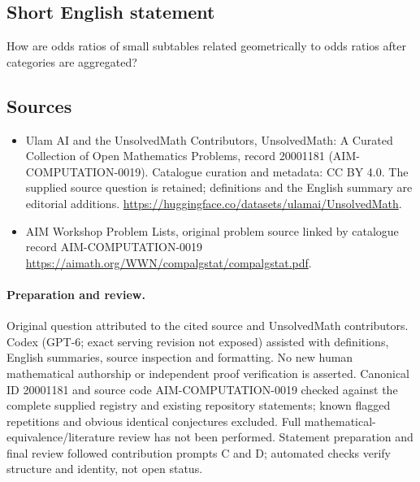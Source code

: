 \documentclass[11pt]{article}
\begin{document}
\subsection{Short English statement}
How are odds ratios of small subtables related geometrically to odds ratios after categories are aggregated?
\subsection{Sources}
\begin{itemize}
\item[\hypertarget{source:20001181:1}{S1}] Ulam AI and the UnsolvedMath Contributors, UnsolvedMath: A Curated Collection of Open Mathematics Problems, record 20001181 (AIM-COMPUTATION-0019). Catalogue curation and metadata: CC BY 4.0. The supplied source question is retained; definitions and the English summary are editorial additions.
\url{https://huggingface.co/datasets/ulamai/UnsolvedMath}.
\item[\hypertarget{source:20001181:2}{S2}] AIM Workshop Problem Lists, original problem source linked by catalogue record AIM-COMPUTATION-0019
\url{https://aimath.org/WWN/compalgstat/compalgstat.pdf}.
\end{itemize}
\paragraph{Preparation and review.}
Original question attributed to the cited source and UnsolvedMath contributors. Codex (GPT-6; exact serving revision not exposed) assisted with definitions, English summaries, source inspection and formatting. No new human mathematical authorship or independent proof verification is asserted. Canonical ID 20001181 and source code AIM-COMPUTATION-0019 checked against the complete supplied registry and existing repository statements; known flagged repetitions and obvious identical conjectures excluded. Full mathematical-equivalence/literature review has not been performed. Statement preparation and final review followed contribution prompts C and D; automated checks verify structure and identity, not open status.
\label{end:20001181}
\end{document}
